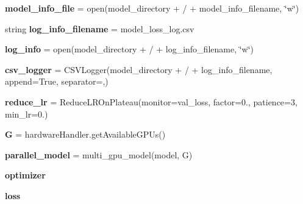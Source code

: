 \begin{DoxyCompactItemize}
\mbox{\label{namespaceTrainModels_a61a9fe01eefb7883dec4a8152d01ddde}} 
{\bfseries model\+\_\+info\+\_\+file} = open(model\+\_\+directory + \textquotesingle{}/\textquotesingle{} + model\+\_\+info\+\_\+filename, \char`\"{}w\char`\"{})
\item 
\mbox{\label{namespaceTrainModels_af9c0ce73e3d3e5268a5e42722de176c0}} 
string {\bfseries log\+\_\+info\+\_\+filename} = \textquotesingle{}model\+\_\+loss\+\_\+log.\+csv\textquotesingle{}
\item 
\mbox{\label{namespaceTrainModels_a9b47315e4cc6cff4a37c89a32834dcf9}} 
{\bfseries log\+\_\+info} = open(model\+\_\+directory + \textquotesingle{}/\textquotesingle{} + log\+\_\+info\+\_\+filename, \char`\"{}w\char`\"{})
\item 
\mbox{\label{namespaceTrainModels_a809517098c2aa85e7a1c36a3dfc79958}} 
{\bfseries csv\+\_\+logger} = C\+S\+V\+Logger(model\+\_\+directory + \textquotesingle{}/\textquotesingle{} + log\+\_\+info\+\_\+filename, append=True, separator=\textquotesingle{},\textquotesingle{})
\item 
\mbox{\label{namespaceTrainModels_a97b3386fc4c774e4de0153c82d79f9bb}} 
{\bfseries reduce\+\_\+lr} = Reduce\+L\+R\+On\+Plateau(monitor=\textquotesingle{}val\+\_\+loss\textquotesingle{}, factor=0., patience=3, min\+\_\+lr=0.)
\item 
\mbox{\label{namespaceTrainModels_aa04045e6013587a57445ea531a2494a3}} 
{\bfseries G} = hardware\+Handler.\+get\+Available\+G\+P\+Us()
\item 
\mbox{\label{namespaceTrainModels_a933ae8fedd7fe0f9db12ba7e87ea9599}} 
{\bfseries parallel\+\_\+model} = multi\+\_\+gpu\+\_\+model(model, G)
\item 
\mbox{\label{namespaceTrainModels_a7bd18c0ee274c3242b3fd4e910d99ef8}} 
{\bfseries optimizer}
\item 
\mbox{\label{namespaceTrainModels_a1dbfdd998d46b9ad68d8484c195ec7f3}} 
{\bfseries loss}
\item 

\end{DoxyCompactItemize}
